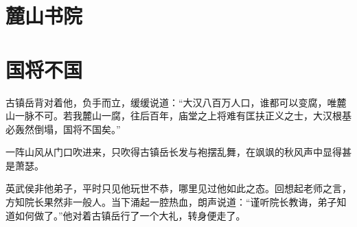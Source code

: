 \section{麓山书院}


\section{国将不国}
古镇岳背对着他，负手而立，缓缓说道：“大汉八百万人口，谁都可以变腐，唯麓山一脉不可。若我麓山一腐，往后百年，庙堂之上将难有匡扶正义之士，大汉根基必轰然倒塌，国将不国矣。”

一阵山风从门口吹进来，只吹得古镇岳长发与袍摆乱舞，在飒飒的秋风声中显得甚是萧瑟。

英武侯非他弟子，平时只见他玩世不恭，哪里见过他如此之态。回想起老师之言，方知院长果然非一般人。当下涌起一腔热血，朗声说道：“谨听院长教诲，弟子知道如何做了。”他对着古镇岳行了一个大礼，转身便走了。

\section{}
\section{}


